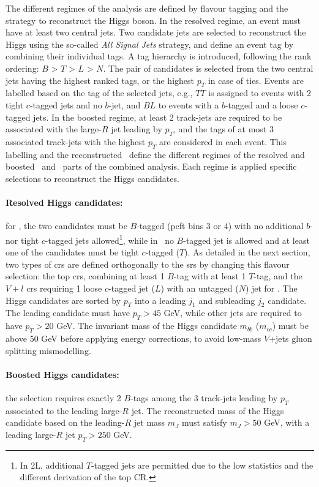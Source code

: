 The different regimes of the analysis are defined by flavour tagging and the strategy to reconstruct the Higgs boson. In the resolved regime, an event must have at least two central jets. Two candidate jets are selected to reconstruct the Higgs using the so-called \textit{All Signal Jets} strategy, and define an event tag by combining their individual tags. A tag hierarchy is introduced, following the rank ordering: $B$ > $T$ > $L$ > $N$. The pair of candidates is selected from the two central jets having the highest ranked tags, or the highest $p_T$ in case of ties. Events are labelled based on the tag of the selected jets, e.g., $TT$ is assigned to events with 2 tight $c$-tagged jets and no $b$-jet, and $BL$ to events with a $b$-tagged and a loose $c$-tagged jets. In the boosted regime, at least 2 track-jets are required to be associated with the large-$R$ jet leading by $p_T$, and the tags of at most 3 associated track-jets with the highest $p_T$ are considered in each event. This labelling and the reconstructed \ptv\ define the different regimes of the resolved and boosted \vhb\ and \vhc\ parts of the combined analysis. Each regime is applied specific selections to reconstruct the Higgs candidates. 

\paragraph{Resolved Higgs candidates:} for \vhb, the two candidates must be $B$-tagged (\gls{pcft} bins 3 or 4) with no additional $b$- nor tight $c$-tagged jets allowed\footnote{In 2L, additional $T$-tagged jets are permitted due to the low statistics and the different derivation of the top CR.}, while in \vhc\ no $B$-tagged jet is allowed and at least one of the candidates must be tight $c$-tagged ($T$). As detailed in the next section, two types of \glspl{cr} are defined orthogonally to the \glspl{sr} by changing this flavour selection: the top \glspl{cr}, combining at least 1 $B$-tag with at least 1 $T$-tag, and the $V+l$ \glspl{cr} requiring 1 loose $c$-tagged jet ($L$) with an untagged ($N$) jet for \vhc. The Higgs candidates are sorted by $p_T$ into a leading $j_1$ and subleading $j_2$ candidate. The leading candidate must have $p_T > 45$ GeV, while other jets are required to have $p_T > 20$ GeV. The invariant mass of the Higgs candidate $m_{bb}$ ($m_{cc}$) must be above 50 GeV before applying energy corrections, to avoid low-mass $V$+jets gluon splitting mismodelling.  

\paragraph{Boosted Higgs candidates:} the selection requires exactly 2 $B$-tags among the 3 track-jets leading by $p_T$ associated to the leading large-$R$ jet. The reconstructed mass of the Higgs candidate based on the leading-$R$ jet mass $m_J$ must satisfy $m_J > 50$ GeV, with a leading large-$R$ jet $p_T > 250$ GeV. \\

